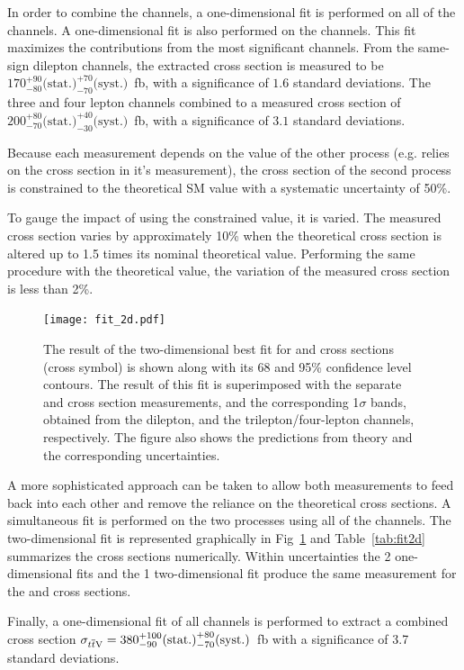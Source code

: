 In order to combine the \ttZ channels, a one-dimensional fit is performed on all of the channels. A one-dimensional fit is also performed on the \ttW channels. This fit maximizes the contributions from the most significant channels. From the same-sign dilepton channels, the extracted \ttW cross section is measured to be  $170 ^{+90}_{-80} \textrm{(stat.)} ^{+70}_{-70} \textrm{(syst.)}$~fb, with a significance of $1.6$ standard deviations. The three and four lepton channels combined to a measured \ttZ cross section of 
$200 ^{+80}_{-70} \textrm{(stat.)} ^{+40}_{-30} \textrm{(syst.)}$~fb, with a significance of $3.1$ standard deviations. 

Because each measurement depends on the value of the other process (e.g. \ttZ relies on the \ttW cross section in it's measurement), the cross section of the second process is constrained to the theoretical SM value with a systematic uncertainty of 50\%.

To gauge the impact of using the constrained value, it is varied. The measured \ttW cross section varies by approximately 10\% 
when the theoretical \ttZ cross section is altered up to 1.5 times its nominal theoretical value.  
Performing the same procedure with the \ttW theoretical value, the variation of the measured \ttZ cross section 
is less than 2\%. 

\begin{figure}[!h]
\texttt{[image: fit\_2d.pdf]}
\caption{\label{fig:combination_2d} The result of the two-dimensional best fit for \ttW and \ttZ{} cross sections 
(cross symbol) 
is shown along with its 68 and 95\% confidence level contours. The result of this fit is superimposed with the 
separate \ttW and \ttZ{} cross section measurements, and the corresponding 1$\sigma$ bands, obtained 
from the dilepton, and the trilepton/four-lepton channels, respectively. The figure also shows the 
predictions from theory and the corresponding uncertainties.}
\end{figure}

A more sophisticated approach can be taken to allow both measurements to feed back into each other and remove the reliance on the theoretical cross sections. A simultaneous fit is performed on the two processes using all of the channels. The two-dimensional fit is represented graphically in Fig~\ref{fig:combination_2d} and Table~\ref{tab:fit2d} summarizes the cross sections numerically. Within uncertainties the 2 one-dimensional fits and the 1 two-dimensional fit produce the same measurement for the \ttZ and \ttW cross sections.



%
Finally, a one-dimensional fit of all channels is performed to extract a combined cross section 
$\sigma_{\relax{t}\overline{\relax{t}}\textrm{V}} = 380 ^{+100}_{-90} \textrm{(stat.)} ^{+80}_{-70} \textrm{(syst.)}$~fb 
with a significance of 3.7 standard deviations. 
%

 
